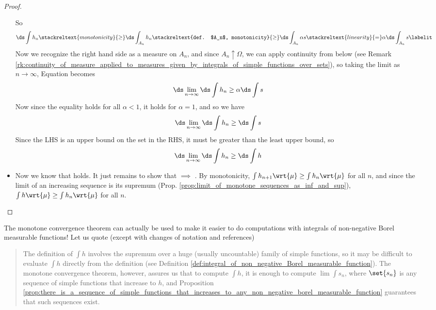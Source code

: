 \documentclass{article} %
\begin{document}
\begin{proof}
\begin{itemize}
So
\begin{align*}
 \ds\int h_n  \stackreltext{monotonicity}{\geq} \ds\int_{A_n} h_n \stackreltext{def. $A_n$, monotonicity}{\geq} \ds\int_{A_n} \alpha s \stackreltext{linearity}{=} \alpha   \ds\int_{A_n} s 
 \labelit \label{eqn:intermediate_eqn_from_proof_mct} 
 \end{align*}
   Now we recognize the right hand side as a measure on $A_n$, and since $A_n \uparrow \Omega$, we can apply continuity from below (see Remark \ref{rk:continuity_of_measure_applied_to_measures_given_by_integrals_of_simple_functions_over_sets}), so taking the limit as $n \to \infty$, Equation  becomes
\[  \ds\lim_{n \to \infty} \ds\int h_n  \geq \alpha \ds\int s \]
Now since the equality holds for all $\alpha <1$, it holds for $\alpha =1$, and so we have
\[   \ds\lim_{n \to \infty}  \ds\int h_n  \geq \ds\int s \]
Since the LHS is an upper bound on the set in the RHS, it must be greater than the least upper bound, so 
\[   \ds\lim_{n \to \infty}  \ds\int h_n  \geq \ds\int h \]
\item Now we know that  holds.  It just remains to show that  $\implies$ .  By monotonicity, $\int h_{n+1} \wrt{\mu}  \geq \int h_{n} \wrt{\mu}$ for all $n$, and since the limit of an increasing sequence is its supremum (Prop. \ref{prop:limit_of_monotone_sequences_as_inf_and_sup}), $\int h \wrt{\mu}  \geq \int h_{n} \wrt{\mu}$ for all $n$.
\end{itemize}
\end{proof}


\begin{remark}{}
The monotone convergence theorem can actually be used to make it easier to do computations with integrals of non-negative Borel measurable functions!  Let us quote \cite{folland1999real} (except with changes of notation and references)

\begin{quotation}
 The definition of $\int h$  involves the supremum over a huge (usually uncountable) family of simple functions, so it may be difficult to evaluate $\int h$ directly from the definition (see Definition \ref{def:integral_of_non_negative_Borel_measurable_function}).  The monotone convergence theorem, however, assures us that to compute $\int h$, it is enough to compute $\lim \int s_n$, where $\set{s_n}$ is any sequence of simple functions that increase to $h$, and Proposition \ref{prop:there_is_a_sequence_of_simple_functions_that_increases_to_any_non_negative_borel_measurable_function} guarantees that such sequences exist. 
\end{quotation}
\end{remark}
\end{document}

